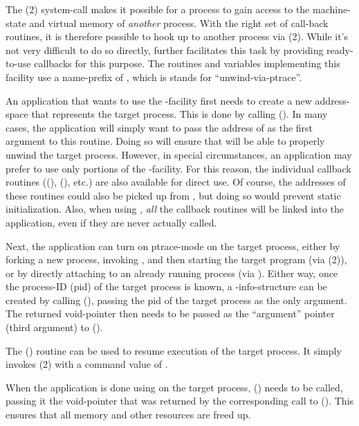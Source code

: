 \documentclass{article}
\begin{document}
The (2) system-call makes it possible for a process to
gain access to the machine-state and virtual memory of \emph{another}
process.  With the right set of call-back routines, it is therefore
possible to hook up  to another process via
(2).  While it's not very difficult to do so directly,
 further facilitates this task by providing
ready-to-use callbacks for this purpose.  The routines and variables
implementing this facility use a name-prefix of , which is
stands for ``unwind-via-ptrace''.

An application that wants to use the -facility first needs
to create a new  address-space that represents the
target process.  This is done by calling
().  In many cases, the application
will simply want to pass the address of  as the
first argument to this routine.  Doing so will ensure that
 will be able to properly unwind the target process.
However, in special circumstances, an application may prefer to use
only portions of the -facility.  For this reason, the
individual callback routines ((),
(), etc.)  are also available for direct
use.  Of course, the addresses of these routines could also be picked
up from , but doing so would prevent static
initialization.  Also, when using , \emph{all}
the callback routines will be linked into the application, even if
they are never actually called.

Next, the application can turn on ptrace-mode on the target process,
either by forking a new process, invoking , and
then starting the target program (via (2)), or by
directly attaching to an already running process (via
).  Either way, once the process-ID (pid) of the
target process is known, a -info-structure can be created
by calling (), passing the pid of the target process
as the only argument.  The returned void-pointer then needs to be
passed as the ``argument'' pointer (third argument) to
().

The () routine can be used to resume execution of
the target process.  It simply invokes (2) with a command
value of .

When the application is done using  on the target
process, () needs to be called, passing it the
void-pointer that was returned by the corresponding call to
().  This ensures that all memory and other
resources are freed up.
\end{document}
